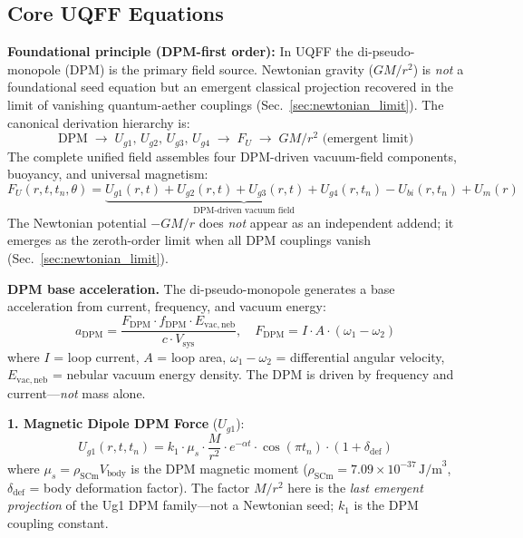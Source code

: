 \documentclass[12pt,a4paper]{article}
\begin{document}
\subsection{Core UQFF Equations}
\label{sec:core_equations}

\textbf{Foundational principle (DPM-first order):} In UQFF the di-pseudo-monopole (DPM) is the primary field source. Newtonian gravity ($GM/r^2$) is \textit{not} a foundational seed equation but an emergent classical projection recovered in the limit of vanishing quantum-aether couplings (Sec.~\ref{sec:newtonian_limit}). The canonical derivation hierarchy is:
\begin{equation}
\text{DPM} \;\longrightarrow\; U_{g1},\, U_{g2},\, U_{g3},\, U_{g4} \;\longrightarrow\; F_U \;\longrightarrow\; GM/r^2 \text{ (emergent limit)}
\label{eq:dpm_hierarchy}
\end{equation}
The complete unified field assembles four DPM-driven vacuum-field components, buoyancy, and universal magnetism:
\begin{equation}
F_U(r, t, t_n, \theta) = \underbrace{U_{g1}(r,t) + U_{g2}(r,t) + U_{g3}(r,t) + U_{g4}(r,t_n)}_{\text{DPM-driven vacuum field}} - U_{bi}(r,t_n) + U_m(r)
\label{eq:unified_field}
\end{equation}
The Newtonian potential $-GM/r$ does \textit{not} appear as an independent addend; it emerges as the zeroth-order limit when all DPM couplings vanish (Sec.~\ref{sec:newtonian_limit}).

\textbf{DPM base acceleration.} The di-pseudo-monopole generates a base acceleration from current, frequency, and vacuum energy:
\begin{equation}
a_{\mathrm{DPM}} = \frac{F_{\mathrm{DPM}} \cdot f_{\mathrm{DPM}} \cdot E_{\mathrm{vac,neb}}}{c \cdot V_{\mathrm{sys}}}, \quad F_{\mathrm{DPM}} = I \cdot A \cdot (\omega_1 - \omega_2)
\label{eq:dpm_base}
\end{equation}
where $I$ = loop current, $A$ = loop area, $\omega_1 - \omega_2$ = differential angular velocity, $E_{\mathrm{vac,neb}}$ = nebular vacuum energy density. The DPM is driven by frequency and current---\textit{not} mass alone.

\textbf{1. Magnetic Dipole DPM Force} ($U_{g1}$):
\begin{equation}
U_{g1}(r, t, t_n) = k_1 \cdot \mu_s \cdot \frac{M}{r^2} \cdot e^{-\alpha t} \cdot \cos(\pi t_n) \cdot (1 + \delta_{\mathrm{def}})
\label{eq:dug1}
\end{equation}
where $\mu_s = \rho_{\mathrm{SCm}} V_{\mathrm{body}}$ is the DPM magnetic moment ($\rho_{\mathrm{SCm}} = 7.09 \times 10^{-37}\,\text{J/m}^3$, $\delta_{\mathrm{def}}$ = body deformation factor). The factor $M/r^2$ here is the \textit{last emergent projection} of the Ug1 DPM family---not a Newtonian seed; $k_1$ is the DPM coupling constant.
\end{document}
